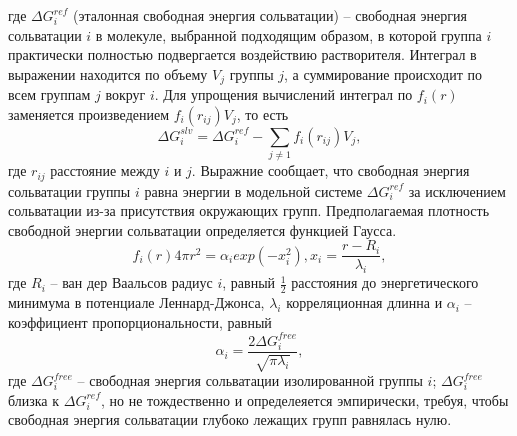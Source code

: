 где $\Delta G_i^{ref}$ (эталонная свободная энергия сольватации) -- свободная энергия сольватации $i$ в молекуле, выбранной подходящим образом, в которой группа $i$ практически полностью подвергается воздействию растворителя. Интеграл в выражении находится по объему $V_j$ группы $j$, а суммирование происходит по всем группам $j$ вокруг $i$. Для упрощения вычислений интеграл по $f_i(r)$ заменяется произведением $f_i(r_{ij})V_j$, то есть
\[\Delta G_i^{slv} = \Delta G_i^{ref} - \sum_{j \neq 1} f_i(r_{ij}) V_j,\]
где $r_{ij}$ расстояние между $i$ и $j$. Выражние сообщает, что свободная энергия сольватации группы $i$ равна энергии в модельной системе $\Delta G_i^{ref}$ за исключением сольватации из-за присутствия окружающих групп. Предполагаемая плотность свободной энергии сольватации определяется функцией Гаусса.
\[f_i(r) 4 \pi r^2 = \alpha_i exp(-x_i^2), x_i = \frac{r - R_i}{\lambda_i},\]
где $R_i$ -- ван дер Ваальсов радиус $i$, равный $\frac{1}{2}$ расстояния до энергетического минимума в потенциале Леннард-Джонса, $\lambda_i$ корреляционная длинна и $\alpha_i$ -- коэффициент пропорциональности, равный
\[\alpha_i = \frac{2 \Delta G_i^{free}}{\sqrt{\pi \lambda_i}},\]
где $\Delta G_i^{free}$ -- свободная энергия сольватации изолированной группы $i$; $\Delta G_i^{free}$ близка к $\Delta G_i^{ref}$, но не тождественно и определеяется эмпирически, требуя, чтобы свободная энергия сольватации глубоко лежащих групп равнялась нулю.





